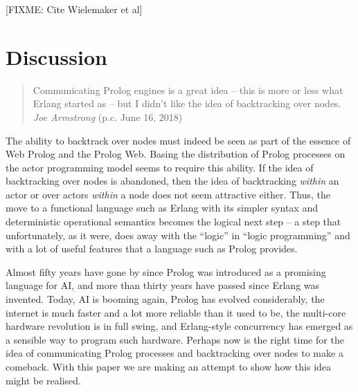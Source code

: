 \documentclass{tlp}
\begin{document}
[FIXME: Cite Wielemaker et al]


\section{Discussion}\label{sec:discussion}

\begin{quote}
Communicating Prolog engines is a great idea -- this is more or less what Erlang started as -- but I didn't like the idea of backtracking over nodes. \flushright \textit{Joe Armstrong} (p.c. June 16, 2018)
\end{quote}

\vspace{2mm}

\noindent The ability to backtrack over nodes must indeed be seen as part of the essence of Web Prolog and the Prolog Web. Basing the distribution of Prolog processes on the actor programming model seems to require this ability. If the idea of backtracking over nodes is abandoned, then the idea of backtracking \textit{within} an actor or over actors \textit{within} a node does not seem attractive either. Thus, the move to a functional language such as Erlang with its simpler syntax and deterministic operational semantics becomes the logical next step -- a step that unfortunately, as it were, does away with the ``logic'' in ``logic programming'' and with a lot of useful features that a language such as Prolog provides.


Almost fifty years have gone by since Prolog was introduced as a promising language for AI, and more than thirty years have passed since Erlang was invented. Today, AI is booming again, Prolog has evolved considerably, the internet is much faster and a lot more reliable than it used to be, the multi-core hardware revolution is in full swing, and Erlang-style concurrency has emerged as a sensible way to program such hardware. Perhaps now is the right time for the idea of communicating Prolog processes and backtracking over nodes to make a comeback. With this paper we are making an attempt to show how this idea might be realised.
\end{document}
